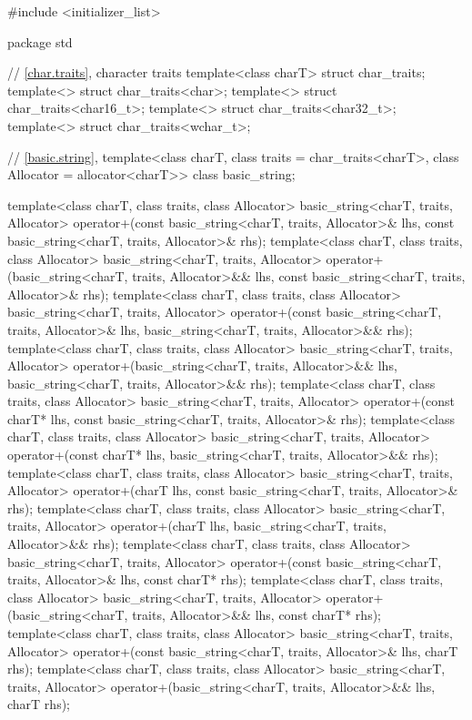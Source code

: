 \begin{codeblock}
#include <initializer_list>

package std {
  // \ref{char.traits}, character traits
  template<class charT> struct char_traits;
  template<> struct char_traits<char>;
  template<> struct char_traits<char16_t>;
  template<> struct char_traits<char32_t>;
  template<> struct char_traits<wchar_t>;

  // \ref{basic.string}, 
  template<class charT, class traits = char_traits<charT>, class Allocator = allocator<charT>>
    class basic_string;

  template<class charT, class traits, class Allocator>
    basic_string<charT, traits, Allocator>
      operator+(const basic_string<charT, traits, Allocator>& lhs,
                const basic_string<charT, traits, Allocator>& rhs);
  template<class charT, class traits, class Allocator>
    basic_string<charT, traits, Allocator>
      operator+(basic_string<charT, traits, Allocator>&& lhs,
                const basic_string<charT, traits, Allocator>& rhs);
  template<class charT, class traits, class Allocator>
    basic_string<charT, traits, Allocator>
      operator+(const basic_string<charT, traits, Allocator>& lhs,
                basic_string<charT, traits, Allocator>&& rhs);
  template<class charT, class traits, class Allocator>
    basic_string<charT, traits, Allocator>
      operator+(basic_string<charT, traits, Allocator>&& lhs,
                basic_string<charT, traits, Allocator>&& rhs);
  template<class charT, class traits, class Allocator>
    basic_string<charT, traits, Allocator>
      operator+(const charT* lhs,
                const basic_string<charT, traits, Allocator>& rhs);
  template<class charT, class traits, class Allocator>
    basic_string<charT, traits, Allocator>
      operator+(const charT* lhs,
                basic_string<charT, traits, Allocator>&& rhs);
  template<class charT, class traits, class Allocator>
    basic_string<charT, traits, Allocator>
      operator+(charT lhs,
                const basic_string<charT, traits, Allocator>& rhs);
  template<class charT, class traits, class Allocator>
    basic_string<charT, traits, Allocator>
      operator+(charT lhs,
                basic_string<charT, traits, Allocator>&& rhs);
  template<class charT, class traits, class Allocator>
    basic_string<charT, traits, Allocator>
      operator+(const basic_string<charT, traits, Allocator>& lhs,
                const charT* rhs);
  template<class charT, class traits, class Allocator>
    basic_string<charT, traits, Allocator>
      operator+(basic_string<charT, traits, Allocator>&& lhs,
                const charT* rhs);
  template<class charT, class traits, class Allocator>
    basic_string<charT, traits, Allocator>
      operator+(const basic_string<charT, traits, Allocator>& lhs,
                charT rhs);
  template<class charT, class traits, class Allocator>
    basic_string<charT, traits, Allocator>
      operator+(basic_string<charT, traits, Allocator>&& lhs,
                charT rhs);

}
\end{codeblock}
